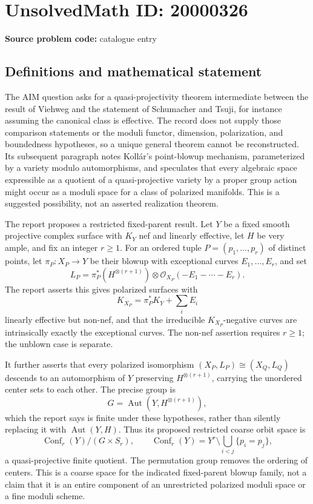 \documentclass[11pt]{article}
\begin{document}
\section*{UnsolvedMath ID: 20000326}
\textbf{Source problem code:} catalogue entry
\subsection{Definitions and mathematical statement}
The AIM question asks for a quasi-projectivity theorem intermediate between the result of Viehweg and the statement of Schumacher and Tsuji, for instance assuming the canonical class is effective. The record does not supply those comparison statements or the moduli functor, dimension, polarization, and boundedness hypotheses, so a unique general theorem cannot be reconstructed. Its subsequent paragraph notes Koll\'ar's point-blowup mechanism, parameterized by a variety modulo automorphisms, and speculates that every algebraic space expressible as a quotient of a quasi-projective variety by a proper group action might occur as a moduli space for a class of polarized manifolds. This is a suggested possibility, not an asserted realization theorem.

The report proposes a restricted fixed-parent result. Let \(Y\) be a fixed smooth projective complex surface with \(K_Y\) nef and linearly effective, let \(H\) be very ample, and fix an integer \(r\geq1\). For an ordered tuple \(P=(p_1,\ldots,p_r)\) of distinct points, let \(\pi_P:X_P\to Y\) be their blowup with exceptional curves \(E_1,\ldots,E_r\), and set
\[
L_P=\pi_P^*(H^{\otimes(r+1)})\otimes\mathcal O_{X_P}(-E_1-\cdots-E_r).
\]
The report asserts this gives polarized surfaces with
\[
K_{X_P}=\pi_P^*K_Y+\sum_iE_i
\]
linearly effective but non-nef, and that the irreducible \(K_{X_P}\)-negative curves are intrinsically exactly the exceptional curves. The non-nef assertion requires \(r\geq1\); the unblown case is separate.

It further asserts that every polarized isomorphism \((X_P,L_P)\cong(X_Q,L_Q)\) descends to an automorphism of \(Y\) preserving \(H^{\otimes(r+1)}\), carrying the unordered center sets to each other. The precise group is
\[
G=\operatorname{Aut}(Y,H^{\otimes(r+1)}),
\]
which the report says is finite under these hypotheses, rather than silently replacing it with \(\operatorname{Aut}(Y,H)\). Thus its proposed restricted coarse orbit space is
\[
\operatorname{Conf}_r(Y)/(G\times S_r),\qquad
\operatorname{Conf}_r(Y)=Y^r\setminus\bigcup_{i<j}\{p_i=p_j\},
\]
a quasi-projective finite quotient. The permutation group removes the ordering of centers. This is a coarse space for the indicated fixed-parent blowup family, not a claim that it is an entire component of an unrestricted polarized moduli space or a fine moduli scheme.
\end{document}
